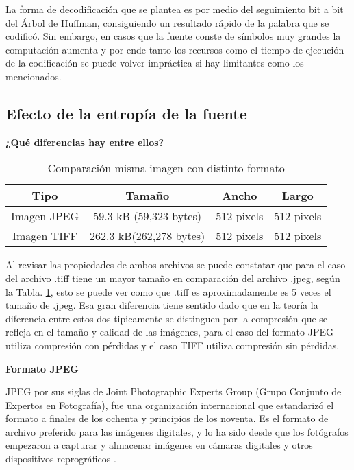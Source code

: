 \documentclass[conference,onecolumn,12pt]{IEEEtran}
\numberwithin{equation}{subsection}
\begin{document}
La forma de decodificación que se plantea es por medio del seguimiento bit a bit del Árbol de Huffman, consiguiendo un resultado rápido de la palabra que se codificó. Sin embargo, en casos que la fuente conste de símbolos muy grandes la computación aumenta y por ende tanto los recursos como el tiempo de ejecución de la codificación se puede volver impráctica si hay limitantes como los mencionados.










\subsection{Efecto de la entropía de la fuente}
\textbf{¿Qué diferencias hay entre ellos? }

\begin{table}[h!]
    \centering
    \caption{Comparación misma imagen con distinto formato }
    \label{tab:jpeg_vs_tiff}
    \begin{tabular}{cccc}
    \toprule
    \textbf{Tipo} & \textbf{Tamaño} & \textbf{Ancho} & \textbf{Largo} \\
    \midrule
    Imagen JPEG & 59.3 kB (59,323 bytes) & 512 pixels & 512 pixels \\
    Imagen TIFF & 262.3 kB(262,278 bytes)& 512 pixels & 512 pixels \\
    \bottomrule
    \end{tabular}
\end{table}


Al revisar las propiedades de ambos  archivos se puede constatar que para el caso del archivo .tiff tiene un mayor tamaño en comparación del archivo .jpeg, según la Tabla. \ref{tab:jpeg_vs_tiff}, esto se puede ver como que .tiff es aproximadamente es 5 veces el tamaño de .jpeg. Esa gran diferencia tiene sentido dado que en la teoría la diferencia entre estos dos tipicamente se distinguen por la compresión que se refleja en el tamaño y calidad de las imágenes, para el caso del formato JPEG utiliza compresión con pérdidas y el caso TIFF utiliza compresión sin pérdidas.


\textbf{Formato JPEG}

JPEG por sus siglas de Joint Photographic Experts Group (Grupo Conjunto de Expertos en Fotografía), fue una organización internacional que estandarizó el formato a finales de los ochenta y principios de los noventa. Es el formato de archivo preferido para las imágenes digitales, y lo ha sido desde que los fotógrafos empezaron a capturar y almacenar imágenes en cámaras digitales y otros dispositivos reprográficos \cite{balanis}.
\end{document}
